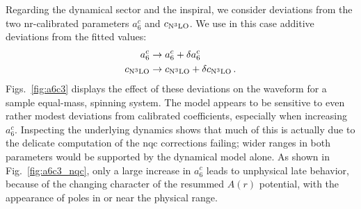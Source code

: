 \documentclass[prd,amssymb,amsmath,amsfonts,nofootinbib,reprint,showpacs,longbibliography]{revtex4-1}
\def\c3{c_{\rm{N}^3\rm{LO}}}
\begin{document}
Regarding the dynamical sector and the inspiral, we consider deviations from the two
\ac{nr}-calibrated parameters $a_6^c$ and $c_{\rm{N}^3\rm{LO}}$.
We use in this case additive deviations from the fitted values:
\begin{subequations}
\begin{align}
a_6^c &\rightarrow a_6^c + \delta a_6^c \\
\c3 &\rightarrow \c3 + \delta \c3 \, .
\end{align}
\end{subequations}
Figs.~\ref{fig:a6c3} displays the effect of these deviations on the waveform for a sample equal-mass, spinning system.
The model appears to be sensitive to even rather modest deviations from calibrated coefficients, especially
when increasing $a_6^c$. Inspecting the underlying dynamics shows that much of this is actually due to
the delicate computation of the \ac{nqc} corrections failing; wider ranges in both parameters would be
supported by the dynamical model alone. As shown in Fig.~\ref{fig:a6c3_nqc}, only a large increase in $a_6^c$
leads to unphysical late behavior, because of the changing character of the resummed $A(r)$ potential, with
the appearance of poles in or near the physical range.
\end{document}
